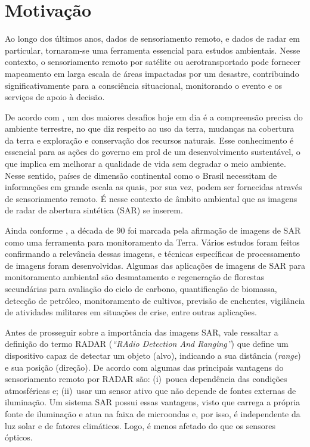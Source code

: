  

\section{Motivação}

Ao longo dos últimos anos, dados de sensoriamento remoto, e dados de radar em particular, tornaram-se uma ferramenta essencial para estudos ambientais. 
Nesse contexto, o sensoriamento remoto por satélite ou aerotransportado pode fornecer mapeamento em larga escala de áreas impactadas por um desastre, contribuindo significativamente para a consciência situacional, monitorando o evento e os serviços de apoio à decisão. 

De acordo com \citet{Frery99}, um dos maiores desafios hoje em dia é a compreensão precisa do ambiente terrestre, no que diz respeito ao uso da terra, mudanças na cobertura da terra e exploração e conservação dos recursos naturais. Esse conhecimento é essencial para as ações do governo em prol de um desenvolvimento sustentável, o que implica em melhorar a qualidade de vida sem degradar o meio ambiente. 
Nesse sentido, países de dimensão continental como o Brasil necessitam de informações em grande escala as quais, por sua vez, podem ser fornecidas através de sensoriamento remoto. 
É nesse contexto de âmbito ambiental que as imagens de radar de abertura sintética (SAR) se inserem.

Ainda conforme \citet{Freitas2005}, a década de $90$ foi marcada pela afirmação de imagens de SAR como uma ferramenta para monitoramento da Terra. 
Vários estudos foram feitos confirmando a relevância dessas imagens, e técnicas específicas de processamento de imagens foram desenvolvidas. 
Algumas das aplicações de imagens de SAR para monitoramento ambiental são desmatamento e regeneração de florestas secundárias para avaliação do ciclo de carbono, quantificação de biomassa, detecção de petróleo, monitoramento de cultivos, previsão de enchentes, vigilância de atividades militares em situações de crise, entre outras aplicações.

Antes de prosseguir sobre a importância das imagens SAR, vale ressaltar a definição do termo RADAR (\textit{``RAdio Detection And Ranging''}) que define um dispositivo capaz de detectar um objeto (alvo), indicando a sua distância (\textit{range}) e sua posição (direção). 
De acordo com \citet{Pottier2009} algumas das principais vantagens do sensoriamento remoto por RADAR são: 
(i)~pouca dependência das condições atmosféricas e; 
(ii)~usar um sensor ativo que não depende de fontes externas de iluminação. 
Um sistema SAR possui essas vantagens, visto que carrega a própria fonte de iluminação e atua na faixa de microondas e, por isso, é independente da luz solar e de fatores climáticos. 
Logo, é menos afetado do que os sensores ópticos. 

